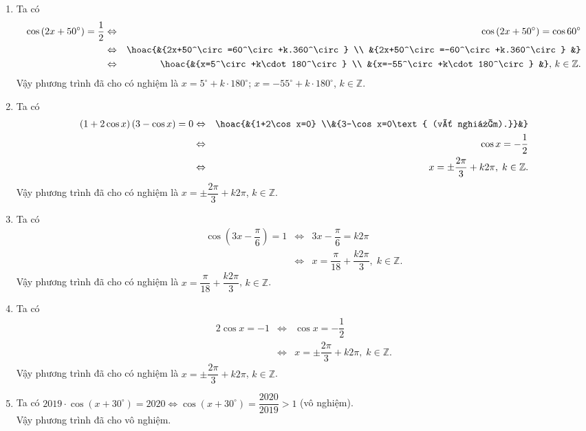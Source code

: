 \begin{ex}
{\begin{enumerate}
			\item  Ta có
			\begin{eqnarray*}
				\cos  \left(2x+50^\circ \right)=\dfrac{1}{2}&\Leftrightarrow& \cos \left(2x+50^\circ \right)=\cos 60^\circ\\
				&\Leftrightarrow& \hoac{&{2x+50^\circ=60^\circ+k.360^\circ} \\ 
				 &{2x+50^\circ=-60^\circ+k.360^\circ}
				&}  \\
				&\Leftrightarrow& \hoac{&{x=5^\circ+k\cdot 180^\circ} \\ 
				&{x=-55^\circ+k\cdot  180^\circ}
				&},\,k\in  \mathbb{Z}.
			\end{eqnarray*}
			Vậy phương trình đã cho có nghiệm là $x=5^\circ+k\cdot 180^\circ$; $x=-55^\circ+k\cdot  180^\circ$, $k\in \mathbb{Z}$.
			\item  Ta có
			\begin{eqnarray*}
				\left(1+2\cos x\right)\left(3-\cos x\right)=0&\Leftrightarrow& \hoac{&{1+2\cos x=0} \\&{3-\cos x=0\text{  (vô nghiệm).}}&}\\
				&\Leftrightarrow&  \cos x=-\dfrac{1}{2} \\
				 &\Leftrightarrow& x=\pm \dfrac{2\pi}{3}+k2\pi,\; k\in \mathbb{Z}.
			\end{eqnarray*}
			Vậy phương trình đã cho có nghiệm là  $x=\pm \dfrac{2\pi}{3}+k2\pi$, $k\in \mathbb{Z}$.
			 \item Ta có
			\begin{eqnarray*}
				\cos \left(3x-\dfrac{\pi}{6} \right)=1&\Leftrightarrow& 3x-\dfrac{\pi}{6}=k2\pi  \\
				&\Leftrightarrow& x=\dfrac{\pi}{18}+\dfrac{k2\pi}{3},\; k\in  \mathbb{Z}.
			\end{eqnarray*}
			Vậy phương trình đã cho có nghiệm là $x=\dfrac{\pi}{18}+\dfrac{k2\pi}{3}$, $k\in \mathbb{Z}$. 
			\item Ta  có
			\begin{eqnarray*}
				2\cos x=-1&\Leftrightarrow& \cos x=-\dfrac{1}{2}\\  &\Leftrightarrow& x=\pm \dfrac{2\pi}{3}+k2\pi,\; k\in \mathbb{Z}.
			\end{eqnarray*}
			Vậy phương trình đã  cho có nghiệm là $x=\pm \dfrac{2\pi}{3}+k2\pi$, $k\in \mathbb{Z}$.
			 \item Ta có $2019\cdot\cos \left(x+30^\circ \right)=2020\Leftrightarrow \cos \left(x+30^\circ \right)=\dfrac{2020}{2019} > 1$ (vô nghiệm).\\
			Vậy phương  trình đã cho vô nghiệm.

\end{enumerate}}
\end{ex}
